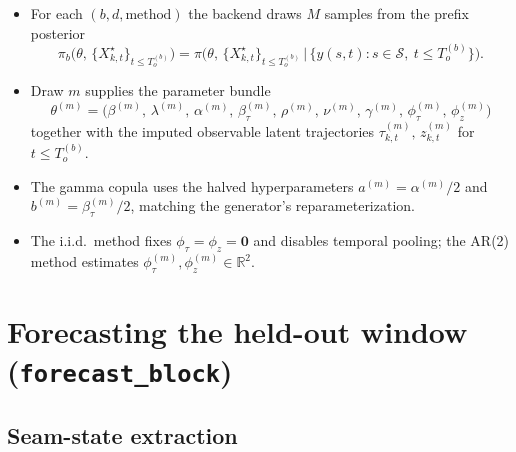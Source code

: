 \documentclass[11pt]{article}
\newcommand{\R}{\mathbb{R}}
\begin{document}
\begin{itemize}[leftmargin=1.4em]
  \item For each $(b,d,\text{method})$ the backend draws $M$ samples
        from the prefix posterior
        \begin{equation}
          \pi_b\big(\theta,\,\{X^\star_{k,t}\}_{t\le T_o^{(b)}}\big)
          = \pi\big(\theta,\,\{X^\star_{k,t}\}_{t\le T_o^{(b)}}
              \,\big\vert\,
              \{y(s,t):s\in\mathcal S,\ t\le T_o^{(b)}\}\big).
          \label{eq:posterior}
        \end{equation}
  \item Draw $m$ supplies the parameter bundle
        \begin{equation}
          \theta^{(m)}
          = \big(\beta^{(m)},\,\lambda^{(m)},\,
                 \alpha^{(m)},\,\beta_\tau^{(m)},\,
                 \rho^{(m)},\,\nu^{(m)},\,\gamma^{(m)},\,
                 \phi_\tau^{(m)},\,\phi_z^{(m)}\big)
          \label{eq:thetabundle}
        \end{equation}
        together with the imputed observable latent trajectories
        $\tau^{(m)}_{k,t},\,z^{(m)}_{k,t}$ for $t\le T_o^{(b)}$.
  \item The gamma copula uses the halved hyperparameters
        $a^{(m)} = \alpha^{(m)}/2$ and $b^{(m)} = \beta_\tau^{(m)}/2$,
        matching the generator's reparameterization.
  \item The i.i.d.\ method fixes $\phi_\tau=\phi_z=\bm 0$ and disables
        temporal pooling; the AR(2) method estimates
        $\phi_\tau^{(m)},\phi_z^{(m)}\in\R^2$.
\end{itemize}

\section{Forecasting the held-out window (\texttt{forecast\_block})}

\subsection{Seam-state extraction}
\end{document}
